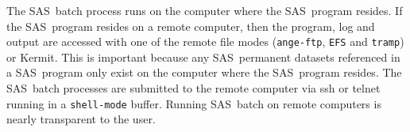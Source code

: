 \documentclass{article}
\newcommand*{\SAS}{\textsc{SAS}}
\newcommand{\stexttt}[1]{{\small\texttt{#1}}}
\newenvironment{Comment}{\begin{quote}\small\itshape }{\end{quote}}
\begin{document}
The \SAS\ batch process runs on the computer where the \SAS\ program
resides.  If the \SAS\ program resides on a remote computer, then the
program, log and output are accessed with one of the remote file modes
(\stexttt{ange-ftp}, \stexttt{EFS} and \stexttt{tramp}) or Kermit.
This is important because any \SAS\ permanent datasets referenced in a
\SAS\ program only exist on the computer where the \SAS\ program
resides.  The \SAS\ batch processes are submitted to the remote
computer via ssh or telnet running in a \stexttt{shell-mode} buffer.
Running \SAS\ batch on remote computers is nearly transparent to the user.

\end{document}
